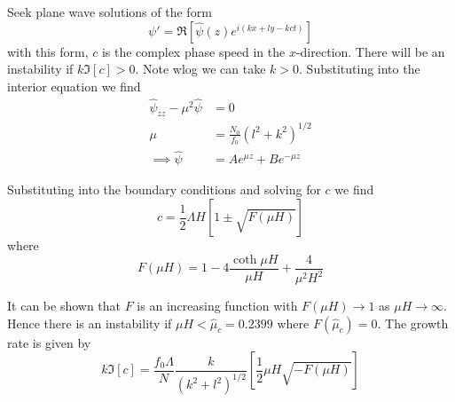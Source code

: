 \documentclass{jknotes}
\begin{document}
Seek plane wave solutions of the form
\begin{equation}
	\psi' = \Re\left[ \hat{\psi}(z) e^{i(kx + ly - kct)}\right]
\end{equation}
with this form, $c$ is the complex phase speed in the $x$-direction. There
will be an instability if $k \Im\left[c\right] > 0$. Note wlog we can take $k
> 0$. Substituting into the interior equation we find 
\begin{align}
	\hat{\psi}_{zz} - \mu^2 \hat{\psi} &= 0\\
	\mu &= \frac{N_0}{f_0} (l^2+k^2)^{1/2} \\
	\implies \hat{\psi} &= A e^{\mu z} + Be^{-\mu z}
\end{align}

Substituting into the boundary conditions and solving for $c$ we find
\begin{equation}
	c = \frac{1}{2} \Lambda H \left[ 1 \pm \sqrt{F(\mu H)}\right]
\end{equation}
where
\begin{equation}
	F(\mu H) = 1-4\frac{\coth \mu H}{\mu H} + \frac{4}{\mu^2 H^2}
\end{equation}

It can be shown that $F$ is an increasing function with $F(\mu H) \to 1$ as
$\mu H \to \infty$. Hence there is an instability if $\mu H < \hat{\mu}_c =
0.2399$ where $F(\hat{\mu}_c) = 0$. The growth rate is given by
\begin{equation}
	k\Im\left[c\right] = \frac{f_0 \Lambda}{N} \frac{k}{(k^2+l^2)^{1/2}}\left[
	\frac{1}{2}\mu H \sqrt{-F(\mu H)}\right]
\end{equation}
\end{document}
